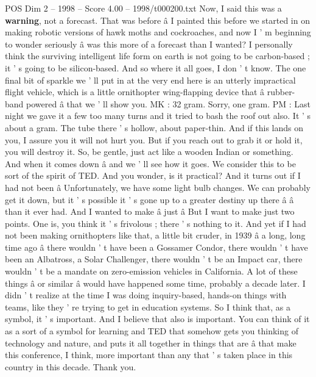 \begin{textsample}{POS Dim 2 – 1998 – Score 4.00 – 1998/t000200.txt}
Now, I said this was a \textbf{warning}, not a forecast.
That was before â I painted this before we started in on making robotic versions of hawk moths and cockroaches, and now I ' m beginning to wonder seriously â was this more of a forecast than I wanted?
I personally think the surviving intelligent life form on earth is not going to be carbon-based ; it ' s going to be silicon-based.
And so where it all goes, I don ' t know.
The one final bit of sparkle we ' ll put in at the very end here is an utterly impractical flight vehicle, which is a little ornithopter wing-flapping device that â rubber-band powered â that we ' ll show you.
MK : 32 gram.
Sorry, one gram.
PM : Last night we gave it a few too many turns and it tried to bash the roof out also.
It ' s about a gram.
The tube there ' s hollow, about paper-thin.
And if this lands on you, I assure you it will not hurt you.
But if you reach out to grab it or hold it, you will destroy it.
So, be gentle, just act like a wooden Indian or something.
And when it comes down â and we ' ll see how it goes.
We consider this to be sort of the spirit of TED.
And you wonder, is it practical?
And it turns out if I had not been â Unfortunately, we have some light bulb changes.
We can probably get it down, but it ' s possible it ' s gone up to a greater destiny up there â â than it ever had.
And I wanted to make â just â But I want to make just two points.
One is, you think it ' s frivolous ; there ' s nothing to it.
And yet if I had not been making ornithopters like that, a little bit cruder, in 1939 â a long, long time ago â there wouldn ' t have been a Gossamer Condor, there wouldn ' t have been an Albatross, a Solar Challenger, there wouldn ' t be an Impact car, there wouldn ' t be a mandate on zero-emission vehicles in California.
A lot of these things â or similar â would have happened some time, probably a decade later.
I didn ' t realize at the time I was doing inquiry-based, hands-on things with teams, like they ' re trying to get in education systems.
So I think that, as a symbol, it ' s important.
And I believe that also is important.
You can think of it as a sort of a symbol for learning and TED that somehow gets you thinking of technology and nature, and puts it all together in things that are â that make this conference, I think, more important than any that ' s taken place in this country in this decade.
Thank you.

\end{textsample}
